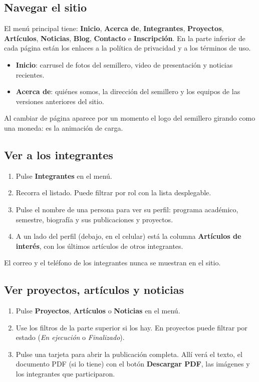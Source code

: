 \documentclass[11pt,a4paper]{article}
\newcommand{\boton}[1]{\textbf{\textcolor{siiisazul}{#1}}}
\begin{document}
\subsection{Navegar el sitio}
El men\'u principal tiene: \boton{Inicio}, \boton{Acerca de}, \boton{Integrantes}, \boton{Proyectos},
\boton{Art\'iculos}, \boton{Noticias}, \boton{Blog}, \boton{Contacto} e \boton{Inscripci\'on}. En la parte inferior de
cada p\'agina est\'an los enlaces a la pol\'itica de privacidad y a los t\'erminos de uso.

\begin{itemize}
  \item \textbf{Inicio}: carrusel de fotos del semillero, video de presentaci\'on y noticias recientes.
  \item \textbf{Acerca de}: qui\'enes somos, la direcci\'on del semillero y los equipos de las versiones anteriores del
    sitio.
\end{itemize}

Al cambiar de p\'agina aparece por un momento el logo del semillero girando como una moneda: es la animaci\'on de carga.

\subsection{Ver a los integrantes}
\begin{enumerate}
  \item Pulse \boton{Integrantes} en el men\'u.
  \item Recorra el listado. Puede filtrar por rol con la lista desplegable.
  \item Pulse el nombre de una persona para ver su perfil: programa acad\'emico, semestre, biograf\'ia y sus
    publicaciones y proyectos.
  \item A un lado del perfil (debajo, en el celular) est\'a la columna \boton{Art\'iculos de inter\'es}, con los
    \'ultimos art\'iculos de otros integrantes.
\end{enumerate}
El correo y el tel\'efono de los integrantes nunca se muestran en el sitio.


\subsection{Ver proyectos, art\'iculos y noticias}
\begin{enumerate}
  \item Pulse \boton{Proyectos}, \boton{Art\'iculos} o \boton{Noticias} en el men\'u.
  \item Use los filtros de la parte superior si los hay. En proyectos puede filtrar por estado (\emph{En ejecuci\'on} o
    \emph{Finalizado}).
  \item Pulse una tarjeta para abrir la publicaci\'on completa. All\'i ver\'a el texto, el documento PDF (si lo tiene)
    con el bot\'on \boton{Descargar PDF}, las im\'agenes y los integrantes que participaron.
\end{enumerate}
\end{document}
